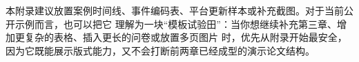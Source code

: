 本附录建议放置案例时间线、事件编码表、平台更新样本或补充截图。对于当前公开示例而言，也可以把它
理解为一块“模板试验田”：当你想继续补充第三章、增加更复杂的表格、插入更长的问卷或放置多页图片
时，优先从附录开始最安全，因为它既能展示版式能力，又不会打断前两章已经成型的演示论文结构。
